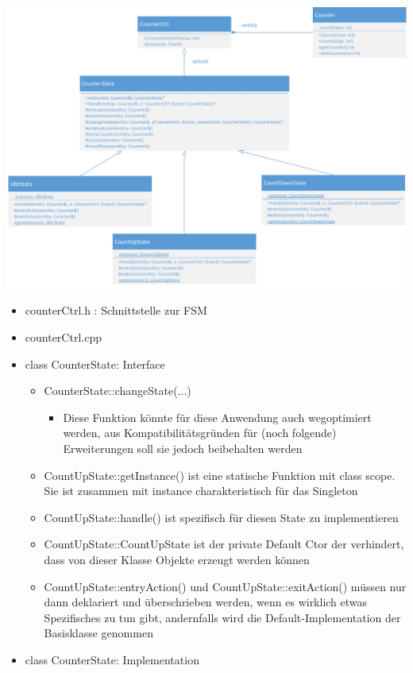 \begin{center}
  \includegraphics[width=0.7\linewidth]{./images/FSM/klassendiagramm}
\end{center}

\begin{itemize}
  \item counterCtrl.h : Schnittstelle zur FSM
        

  \item counterCtrl.cpp
        

  \item class CounterState: Interface
        
        \begin{itemize}
          \item CounterState::changeState(...)
                \begin{itemize}
                  \item Diese Funktion könnte für diese Anwendung auch wegoptimiert werden, aus Kompatibilitätsgründen für (noch folgende) Erweiterungen soll sie jedoch beibehalten werden
                \end{itemize}
          \item CountUpState::getInstance() ist eine statische Funktion mit class scope. Sie ist zusammen mit instance charakteristisch für das Singleton
          \item CountUpState::handle() ist spezifisch für diesen State zu implementieren
          \item CountUpState::CountUpState ist der private Default Ctor der verhindert, dass von dieser Klasse Objekte erzeugt werden können
          \item CountUpState::entryAction() und CountUpState::exitAction() müssen nur dann deklariert und überschrieben werden, wenn es wirklich etwas Spezifisches zu tun gibt, andernfalls wird die Default-Implementation der Basisklasse genommen
        \end{itemize}
  \item class CounterState: Implementation
        
\end{itemize}


